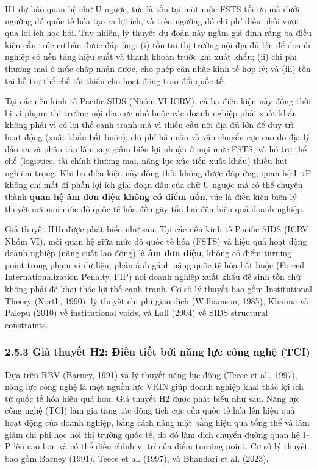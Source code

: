\documentclass[12pt,a4paper]{article}
\begin{document}
H1 dự báo quan hệ chữ U ngược, tức là tồn tại một mức FSTS tối ưu mà
dưới ngưỡng đó quốc tế hóa tạo ra lợi ích, và trên ngưỡng đó chi phí
điều phối vượt qua lợi ích học hỏi. Tuy nhiên, lý thuyết dự đoán này
ngầm giả định rằng ba điều kiện cấu trúc cơ bản được đáp ứng: (i) tồn
tại thị trường nội địa đủ lớn để doanh nghiệp có nền tảng hiệu suất và
thanh khoản trước khi xuất khẩu; (ii) chi phí thương mại ở mức chấp nhận
được, cho phép cân nhắc kinh tế hợp lý; và (iii) tồn tại hỗ trợ thể chế
tối thiểu cho hoạt động trao đổi quốc tế.

Tại các nền kinh tế Pacific SIDS (Nhóm VI ICRV), cả ba điều kiện này
đồng thời bị vi phạm: thị trường nội địa cực nhỏ buộc các doanh nghiệp
phải xuất khẩu không phải vì có lợi thế cạnh tranh mà vì thiếu cầu nội
địa đủ lớn để duy trì hoạt động (xuất khẩu bắt buộc); chi phí hậu cần và
vận chuyển cực cao do địa lý đảo xa và phân tán làm suy giảm biên lợi
nhuận ở mọi mức FSTS; và hỗ trợ thể chế (logistics, tài chính thương
mại, năng lực xúc tiến xuất khẩu) thiếu hụt nghiêm trọng. Khi ba điều
kiện này đồng thời không được đáp ứng, quan hệ I→P không chỉ mất đi phần
lợi ích giai đoạn đầu của chữ U ngược mà có thể chuyển thành
\textbf{quan hệ âm đơn điệu không có điểm uốn}, tức là điều kiện biên lý
thuyết nơi mọi mức độ quốc tế hóa đều gây tổn hại đến hiệu quả doanh
nghiệp.

Giả thuyết H1b được phát biểu như sau. Tại các nền kinh tế Pacific SIDS
(ICRV Nhóm VI), mối quan hệ giữa mức độ quốc tế hóa (FSTS) và hiệu quả
hoạt động doanh nghiệp (năng suất lao động) là \textbf{âm đơn điệu},
không có điểm turning point trong phạm vi dữ liệu, phản ánh gánh nặng
quốc tế hóa bắt buộc (Forced Internationalization Penalty, FIP) nơi
doanh nghiệp xuất khẩu để sinh tồn chứ không phải để khai thác lợi thế
cạnh tranh. Cơ sở lý thuyết bao gồm Institutional Theory (North, 1990),
lý thuyết chi phí giao dịch (Williamson, 1985), Khanna và Palepu (2010)
về institutional voids, và Lall (2004) về SIDS structural constraints.

\hypertarget{253-giux1ea3-thuyux1ebft-h2-ux111iux1ec1u-tiux1ebft-bux1edfi-nux103ng-lux1ef1c-cuxf4ng-nghux1ec7-tci}{%
\subsubsection{2.5.3 Giả thuyết H2: Điều tiết bởi năng lực công nghệ
(TCI)}\label{253-giux1ea3-thuyux1ebft-h2-ux111iux1ec1u-tiux1ebft-bux1edfi-nux103ng-lux1ef1c-cuxf4ng-nghux1ec7-tci}}

Dựa trên RBV (Barney, 1991) và lý thuyết năng lực động (Teece et al.,
1997), năng lực công nghệ là một nguồn lực VRIN giúp doanh nghiệp khai
thác lợi ích từ quốc tế hóa hiệu quả hơn. Giả thuyết H2 được phát biểu
như sau. Năng lực công nghệ (TCI) làm gia tăng tác động tích cực của
quốc tế hóa lên hiệu quả hoạt động của doanh nghiệp, bằng cách nâng mặt
bằng hiệu quả tổng thể và làm giảm chi phí học hỏi thị trường quốc tế,
do đó làm dịch chuyển đường quan hệ I--P lên cao hơn và có thể điều
chỉnh vị trí của điểm turning point. Cơ sở lý thuyết bao gồm Barney
(1991), Teece et al. (1997), và Bhandari et al. (2023).
\end{document}

